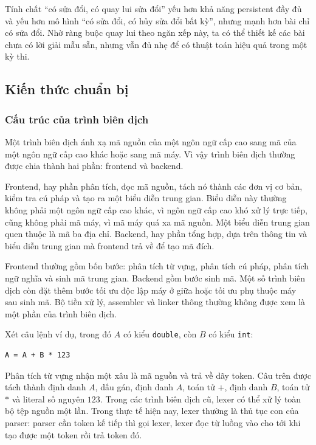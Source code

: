 \documentclass[11pt]{article}
\begin{document}
Tính chất ``có sửa đổi, có quay lui sửa đổi'' yếu hơn khả năng persistent đầy đủ
và yếu hơn mô hình ``có sửa đổi, có hủy sửa đổi bất kỳ'', nhưng mạnh hơn bài chỉ
có sửa đổi. Nhờ ràng buộc quay lui theo ngăn xếp này, ta có thể thiết kế các
bài chưa có lời giải mẫu sẵn, nhưng vẫn đủ nhẹ để có thuật toán hiệu quả trong
một kỳ thi.

\subsection{Kiến thức chuẩn bị}

\subsubsection{Cấu trúc của trình biên dịch}

Một trình biên dịch ánh xạ mã nguồn của một ngôn ngữ cấp cao sang mã của một
ngôn ngữ cấp cao khác hoặc sang mã máy. Vì vậy trình biên dịch thường được chia
thành hai phần: frontend và backend.

Frontend, hay phần phân tích, đọc mã nguồn, tách nó thành các đơn vị cơ bản,
kiểm tra cú pháp và tạo ra một biểu diễn trung gian. Biểu diễn này thường không
phải một ngôn ngữ cấp cao khác, vì ngôn ngữ cấp cao khó xử lý trực tiếp, cũng
không phải mã máy, vì mã máy quá xa mã nguồn. Một biểu diễn trung gian quen
thuộc là mã ba địa chỉ. Backend, hay phần tổng hợp, dựa trên thông tin và biểu
diễn trung gian mà frontend trả về để tạo mã đích.

Frontend thường gồm bốn bước: phân tích từ vựng, phân tích cú pháp, phân tích
ngữ nghĩa và sinh mã trung gian. Backend gồm bước sinh mã. Một số trình biên
dịch còn đặt thêm bước tối ưu độc lập máy ở giữa hoặc tối ưu phụ thuộc máy sau
sinh mã. Bộ tiền xử lý, assembler và linker thông thường không được xem là một
phần của trình biên dịch.

Xét câu lệnh ví dụ, trong đó \(A\) có kiểu \texttt{double}, còn \(B\) có kiểu
\texttt{int}:

\begin{verbatim}
A = A + B * 123
\end{verbatim}

Phân tích từ vựng nhận một xâu là mã nguồn và trả về dãy token. Câu trên được
tách thành định danh \(A\), dấu gán, định danh \(A\), toán tử \(+\), định danh
\(B\), toán tử \(*\) và literal số nguyên \(123\). Trong các trình biên dịch
cũ, lexer có thể xử lý toàn bộ tệp nguồn một lần. Trong thực tế hiện nay, lexer
thường là thủ tục con của parser: parser cần token kế tiếp thì gọi lexer, lexer
đọc từ luồng vào cho tới khi tạo được một token rồi trả token đó.
\end{document}
